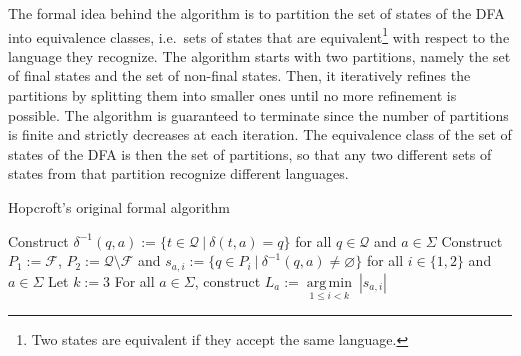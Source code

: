\documentclass[12pt, a4 paper]{article}
\theoremstyle{definition}
\begin{document}
The formal idea behind the algorithm is to partition the set of states of the DFA into equivalence classes, i.e.\ sets of states that are equivalent\footnote{Two states are equivalent if they accept the same language.} with respect to the language they recognize. The algorithm starts with two partitions, namely the set of final states and the set of non-final states. Then, it iteratively refines the partitions by splitting them into smaller ones until no more refinement is possible. The algorithm is guaranteed to terminate since the number of partitions is finite and strictly decreases at each iteration. The equivalence class of the set of states of the DFA is then the set of partitions, so that any two different sets of states from that partition recognize different languages.

\bigskip

\begin{algorithm}[H]
\SetAlgoLined
\caption{Hopcroft's original formal algorithm}
\label{alg:original}
Construct $\delta^{-1}(q, a) := \{t \in \mathcal{Q}\ |\ \delta(t, a) = q\}$ for all $q \in \mathcal{Q}$ and $a \in \Sigma$ \;\label{alg:original:1}
Construct $P_1 := \mathcal{F}$, $P_2 := \mathcal{Q} \setminus \mathcal{F}$ and $s_{a,i} := \{q \in P_i \ | \ \delta^{-1}(q, a) \neq \varnothing \}$ for all $i \in \{1, 2\}$ and $a \in \Sigma$ \;
Let $k := 3$ \;
For all $a \in \Sigma$, construct $L_a := \underset{1 \leq i < k}{\operatorname*{arg\,min}}\ \left| s_{a, i} \right|$ \; \label{alg:original:4}
\end{algorithm}
\end{document}
